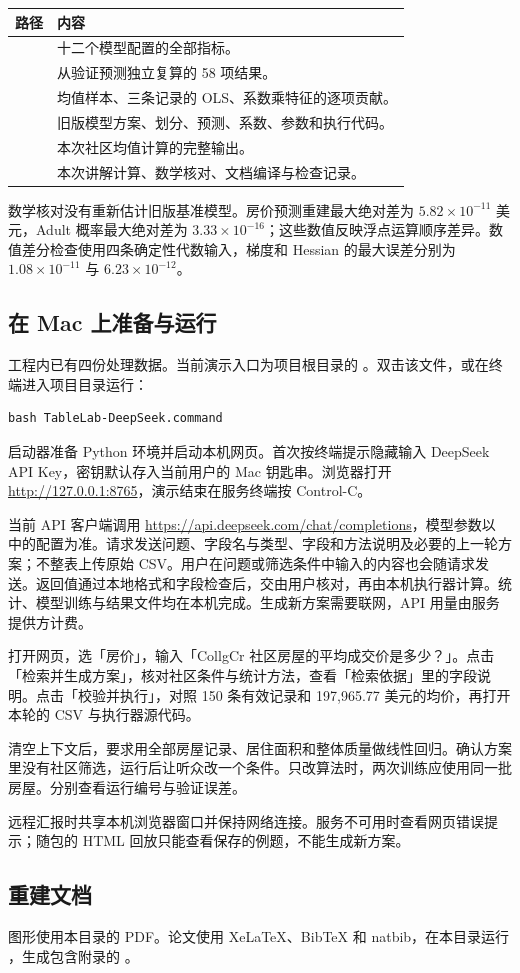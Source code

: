 \begin{center}\small
\begin{tabularx}{\textwidth}{lY}
\toprule
路径 & 内容\\
\midrule
{} & 十二个模型配置的全部指标。\\
 & 从验证预测独立复算的 58 项结果。\\
 & 均值样本、三条记录的 OLS、系数乘特征的逐项贡献。\\
 & 旧版模型方案、划分、预测、系数、参数和执行代码。\\
 & 本次社区均值计算的完整输出。\\
 & 本次讲解计算、数学核对、文档编译与检查记录。\\
\bottomrule
\end{tabularx}
\end{center}
数学核对没有重新估计旧版基准模型。房价预测重建最大绝对差为 $5.82\times10^{-11}$ 美元，Adult 概率最大绝对差为 $3.33\times10^{-16}$；这些数值反映浮点运算顺序差异。数值差分检查使用四条确定性代数输入，梯度和 Hessian 的最大误差分别为 $1.08\times10^{-11}$ 与 $6.23\times10^{-12}$。

\subsection{在 Mac 上准备与运行}
工程内已有四份处理数据。当前演示入口为项目根目录的 。双击该文件，或在终端进入项目目录运行：
\begin{lstlisting}
bash TableLab-DeepSeek.command
\end{lstlisting}
启动器准备 Python 环境并启动本机网页。首次按终端提示隐藏输入 DeepSeek API Key，密钥默认存入当前用户的 Mac 钥匙串。浏览器打开 \url{http://127.0.0.1:8765}，演示结束在服务终端按 Control-C。

当前 API 客户端调用 \url{https://api.deepseek.com/chat/completions}，模型参数以  中的配置为准。请求发送问题、字段名与类型、字段和方法说明及必要的上一轮方案；不整表上传原始 CSV。用户在问题或筛选条件中输入的内容也会随请求发送。返回值通过本地格式和字段检查后，交由用户核对，再由本机执行器计算。统计、模型训练与结果文件均在本机完成。生成新方案需要联网，API 用量由服务提供方计费。

打开网页，选「房价」，输入「CollgCr 社区房屋的平均成交价是多少？」。点击「检索并生成方案」，核对社区条件与统计方法，查看「检索依据」里的字段说明。点击「校验并执行」，对照 150 条有效记录和 197,965.77 美元的均价，再打开本轮的 CSV 与执行器源代码。

清空上下文后，要求用全部房屋记录、居住面积和整体质量做线性回归。确认方案里没有社区筛选，运行后让听众改一个条件。只改算法时，两次训练应使用同一批房屋。分别查看运行编号与验证误差。

远程汇报时共享本机浏览器窗口并保持网络连接。服务不可用时查看网页错误提示；随包的 HTML 回放只能查看保存的例题，不能生成新方案。

\subsection{重建文档}
图形使用本目录的 PDF。论文使用 XeLaTeX、BibTeX 和 natbib，在本目录运行 ，生成包含附录的 。

